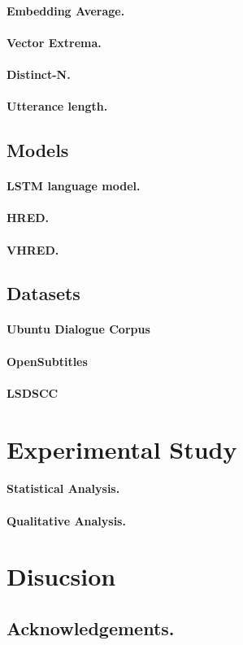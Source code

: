 \documentclass[runningheads]{llncs}
\begin{document}
\paragraph{Embedding Average.}
\paragraph{Vector Extrema.}

\paragraph{Distinct-N.}
\paragraph{Utterance length.}

\subsection{Models}
\paragraph{LSTM language model.}
\paragraph{HRED.}
\paragraph{VHRED.}

\subsection{Datasets}
\paragraph{Ubuntu Dialogue Corpus}
\paragraph{OpenSubtitles}
\paragraph{LSDSCC}


\section{Experimental Study}
\paragraph{Statistical Analysis.}
\paragraph{Qualitative Analysis.}

\section{Disucsion}

\subsection*{Acknowledgements.}



\end{document}
